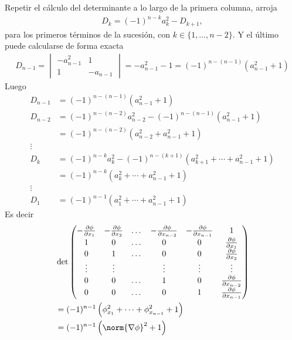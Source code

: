 \documentclass{report}
\theoremstyle{definition}
\theoremstyle{remark}
\begin{document}
  Repetir el cálculo del determinante a lo largo de la primera columna, arroja
  \begin{align}
    D_k = (- 1)^{n - k} a_k^2 - D_{k + 1},
  \end{align}
  para los primeros términos de la sucesión, con \(k \in \{1, \dots, n - 2\}\).
  Y el último puede calcularse de forma exacta
  \begin{align}
    D_{n - 1} 
    =
    \begin{vmatrix}
      - a_{n - 1}^2 &1 \\
      1 &- a_{n - 1}
    \end{vmatrix}
    =
    - a_{n - 1}^2 - 1
    =
    (- 1)^{n - (n - 1)} (a_{n - 1}^2 + 1)
  \end{align}
  Luego
  \begin{align}
    D_{n - 1}
    &=
    (- 1)^{n - (n - 1)} (a_{n - 1}^2 + 1)
    \\
    D_{n - 2}
    &=
    (- 1)^{n - (n - 2)} a_{n - 2}^2 - (- 1)^{n - (n - 1)} (a_{n - 1}^2 + 1)
    \\
    &=
    (- 1)^{n - (n - 2)} (a_{n - 2}^2 + a_{n - 1}^2 + 1)
    \\
    \vdots\nonumber
    \\
    D_k
    &=
    (- 1)^{n - k} a_k^2 - (- 1)^{n - (k + 1)} (a_{k + 1}^2 + \cdots + a_{n - 1}^2 + 1)
    \\
    &=
    (- 1)^{n - k} (a_{k}^2 + \cdots + a_{n - 1}^2 + 1)
    \\
    \vdots\nonumber
    \\
    D_1
    &=
    (-1)^{n - 1} (a_1^2 + \cdots + a_{n - 1}^2 + 1)
  \end{align}
  Es decir
  \begin{align}
    &\det
    \begin{pmatrix}
      - \frac{\partial \phi}{\partial x_1}
      &- \frac{\partial \phi}{\partial x_2}
      &\dots
      &- \frac{\partial \phi}{\partial x_{n - 2}}
      &- \frac{\partial \phi}{\partial x_{n - 1}}
      &1
      \\
      1
      &0
      &\dots
      &0
      &0
      &\frac{\partial \phi}{\partial x_1}
      \\
      0
      &1
      &\dots
      &0
      &0
      &\frac{\partial \phi}{\partial x_2}
      \\
      \vdots
      &\vdots
      &
      &\vdots
      &\vdots
      &\vdots
      \\
      0
      &0
      &\dots
      &1
      &0
      &\frac{\partial \phi}{\partial x_{n - 2}}
      \\
      0
      &0
      &\dots
      &0
      &1
      &\frac{\partial \phi}{\partial x_{n - 1}}
    \end{pmatrix}
    \\
    &=
    (-1)^{n - 1} \left( \phi_{x_1}^2 + \cdots + \phi_{x_{n -1}}^2 + 1 \right)
    \\
    &=
    (-1)^{n - 1} \left( \norm{\nabla \phi}^2 + 1 \right)
  \end{align}
\end{document}
